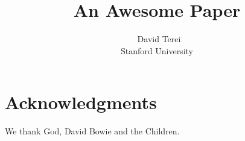 \documentclass[letterpaper,twocolumn,10pt]{article}
\begin{document}
\date{}

\title{\Large \textbf{An Awesome Paper}}

\author{\
{\rm David Terei}\\
Stanford University
}

\maketitle










\section*{Acknowledgments}

We thank God, David Bowie and the Children.

{%
  \frenchspacing
  
  
}
\end{document}

